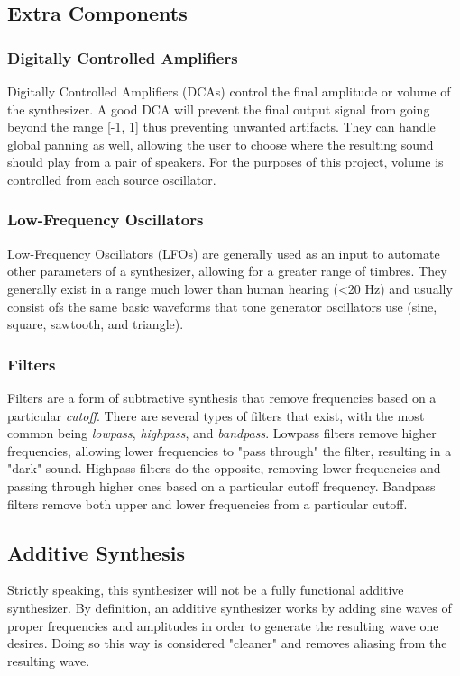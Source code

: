 \documentclass[12pt]{article}
\begin{document}
\subsection{Extra Components}

\subsubsection*{Digitally Controlled Amplifiers}
Digitally Controlled Amplifiers (DCAs) control the final amplitude or volume of the synthesizer. A good DCA will prevent the final output signal from going beyond the range [-1, 1] thus preventing unwanted artifacts. They can handle global panning as well, allowing the user to choose where the resulting sound should play from a pair of speakers. \cite{Pirkle_2015} For the purposes of this project, volume is controlled from each source oscillator.

\subsubsection*{Low-Frequency Oscillators}
Low-Frequency Oscillators (LFOs) are generally used as an input to automate other parameters of a synthesizer, allowing for a greater range of timbres. They generally exist in a range much lower than human hearing (\textless 20 Hz) and usually consist ofs the same basic waveforms that tone generator oscillators use (sine, square, sawtooth, and triangle).

\subsubsection*{Filters}
Filters are a form of subtractive synthesis that remove frequencies based on a particular \textit{cutoff}. There are several types of filters that exist, with the most common being \textit{lowpass}, \textit{highpass}, and \textit{bandpass}. Lowpass filters remove higher frequencies, allowing lower frequencies to "pass through" the filter, resulting in a "dark" sound. Highpass filters do the opposite, removing lower frequencies and passing through higher ones based on a particular cutoff frequency. Bandpass filters remove both upper and lower frequencies from a particular cutoff.

\subsection{Additive Synthesis}
Strictly speaking, this synthesizer will not be a fully functional additive synthesizer. By definition, an additive synthesizer works by adding sine waves of proper frequencies and amplitudes in order to generate the resulting wave one desires. \cite{Pirkle_2015} Doing so this way is considered "cleaner" and removes aliasing from the resulting wave. 
\end{document}
